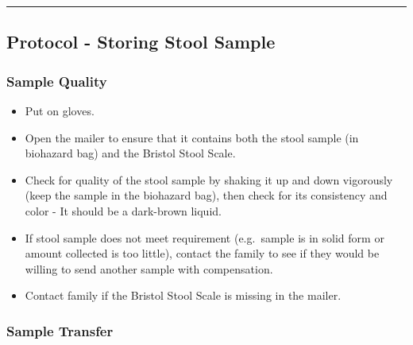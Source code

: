 \documentclass[]{book}
\providecommand{\tightlist}{%
  \setlength{\itemsep}{0pt}\setlength{\parskip}{0pt}}
\begin{document}
\begin{center}\rule{0.5\linewidth}{0.5pt}\end{center}

\hypertarget{protocol---storing-stool-sample}{%
\subsection{Protocol - Storing Stool Sample}\label{protocol---storing-stool-sample}}

\hypertarget{sample-quality-1}{%
\subsubsection{Sample Quality}\label{sample-quality-1}}

\begin{itemize}
\tightlist
\item
  Put on gloves.
\item
  Open the mailer to ensure that it contains both the stool sample (in biohazard bag) and the Bristol Stool Scale.
\item
  Check for quality of the stool sample by shaking it up and down vigorously (keep the sample in the biohazard bag), then check for its consistency and color - It should be a dark-brown liquid.
\item
  If stool sample does not meet requirement (e.g.~sample is in solid form or amount collected is too little), contact the family to see if they would be willing to send another sample with compensation.
\item
  Contact family if the Bristol Stool Scale is missing in the mailer.
\end{itemize}

\hypertarget{sample-transfer-1}{%
\subsubsection{Sample Transfer}\label{sample-transfer-1}}
\end{document}
